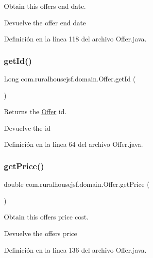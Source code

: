 Obtain this offers end date. 

\begin{DoxyReturn}{Devuelve}
the offer end date 
\end{DoxyReturn}


Definición en la línea 118 del archivo Offer.\+java.

\mbox{\label{a00184_aebea4d12647f454b017ef7102b70fd90}} 
\subsubsection{\texorpdfstring{getId()}{getId()}}
{\footnotesize\ttfamily Long com.\+ruralhousejsf.\+domain.\+Offer.\+get\+Id (\begin{DoxyParamCaption}{ }\end{DoxyParamCaption})}



Returns the \mbox{\hyperlink{a00184}{Offer}} id. 

\begin{DoxyReturn}{Devuelve}
the id 
\end{DoxyReturn}


Definición en la línea 64 del archivo Offer.\+java.

\mbox{\label{a00184_a498e3f0617a7a097d68857ce20e6addd}} 
\subsubsection{\texorpdfstring{getPrice()}{getPrice()}}
{\footnotesize\ttfamily double com.\+ruralhousejsf.\+domain.\+Offer.\+get\+Price (\begin{DoxyParamCaption}{ }\end{DoxyParamCaption})}



Obtain this offers price cost. 

\begin{DoxyReturn}{Devuelve}
the offers price 
\end{DoxyReturn}


Definición en la línea 136 del archivo Offer.\+java.

